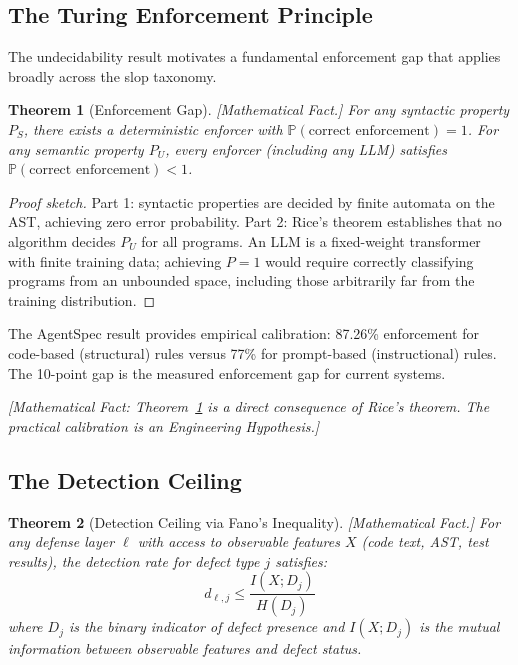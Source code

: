 \documentclass[11pt, a4paper, copyright]{googledeepmind}
\newtheorem{theorem}{Theorem}[section]
\newcommand{\Prob}{\mathbb{P}}
\begin{document}
\subsection{The Turing Enforcement Principle}

The undecidability result motivates a fundamental enforcement gap that applies broadly across the slop taxonomy.

\begin{theorem}[Enforcement Gap]
\label{thm:enforcement-gap}
\emph{[Mathematical Fact.]} For any syntactic property $P_S$, there exists a deterministic enforcer with $\Prob(\text{correct enforcement}) = 1$. For any semantic property $P_U$, every enforcer (including any LLM) satisfies $\Prob(\text{correct enforcement}) < 1$.
\end{theorem}

\begin{proof}[Proof sketch]
Part 1: syntactic properties are decided by finite automata on the AST, achieving zero error probability. Part 2: Rice's theorem establishes that no algorithm decides $P_U$ for all programs. An LLM is a fixed-weight transformer with finite training data; achieving $P = 1$ would require correctly classifying programs from an unbounded space, including those arbitrarily far from the training distribution.
\end{proof}

The AgentSpec result \citep{wang2026agentspec} provides empirical calibration: 87.26\% enforcement for code-based (structural) rules versus 77\% for prompt-based (instructional) rules. The 10-point gap is the measured enforcement gap for current systems.

\emph{[Mathematical Fact: Theorem~\ref{thm:enforcement-gap} is a direct consequence of Rice's theorem. The practical calibration is an Engineering Hypothesis.]}

\subsection{The Detection Ceiling}

\begin{theorem}[Detection Ceiling via Fano's Inequality]
\label{thm:detection-ceiling}
\emph{[Mathematical Fact.]} For any defense layer $\ell$ with access to observable features $X$ (code text, AST, test results), the detection rate for defect type $j$ satisfies:
\begin{equation}
    d_{\ell,j} \leq \frac{I(X; D_j)}{H(D_j)}
\end{equation}
where $D_j$ is the binary indicator of defect presence and $I(X; D_j)$ is the mutual information between observable features and defect status.
\end{theorem}
\end{document}

